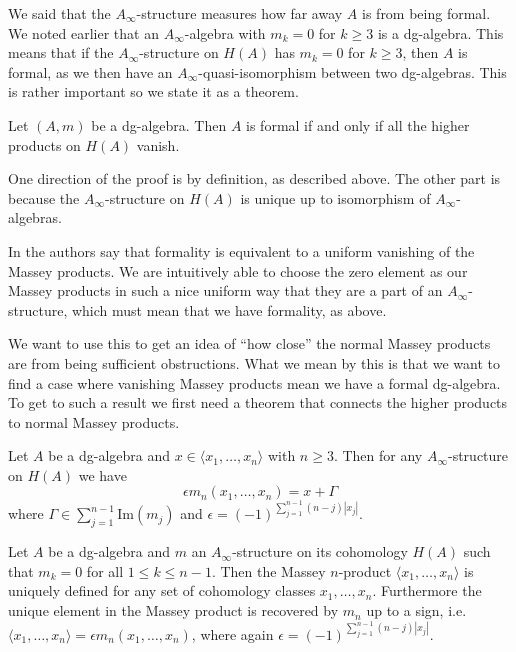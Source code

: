 We said that the $A_\infty$-structure measures how far away $A$ is from being formal. 
We noted earlier that an $A_\infty$-algebra with $m_k=0$ for $k\geq 3$ is a dg-algebra. 
This means that if the $A_\infty$-structure on $H(A)$ has $m_k=0$ for $k\geq 3$, then 
$A$ is formal, as we then have an $A_\infty$-quasi-isomorphism between two dg-algebras. 
This is rather important so we state it as a theorem.

\begin{theorem}
    \label{thm:AHO_formal}
    Let $(A, m)$ be a dg-algebra. Then $A$ is formal if and only if all the higher products
    on $H(A)$ vanish.        
\end{theorem}

One direction of the proof is by definition, as described above. The other part is 
because the $A_\infty$-structure on $H(A)$ is unique up to isomorphism of 
$A_\infty$-algebras.

In \cite{DGMS} the authors say that formality is equivalent to a uniform vanishing of the 
Massey products. We are intuitively able to choose the zero element as our Massey 
products in such a nice uniform way that they are a part of an $A_\infty$-structure, 
which must mean that we have formality, as above.

We want to use this to get an idea of ``how close'' the normal Massey products are 
from being sufficient obstructions. What we mean by this is that we want to find a case 
where vanishing Massey products mean we have a formal dg-algebra. To get to such a result 
we first need a theorem that connects the higher products to normal Massey products.

\begin{theorem}
    Let $A$ be a dg-algebra and $x\in \langle x_1, \ldots, x_n\rangle$ with $n\geq 3$. 
    Then for any $A_\infty$-structure on $H(A)$ we have 
    $$\epsilon m_n(x_1, \ldots, x_n) = x+\Gamma$$ where 
    $\Gamma \in \sum_{j=1}^{n-1}\text{Im}(m_j)$ and 
    $\epsilon = (-1)^{\sum_{j=1}^{n-1} (n-j)|x_j|}$.        
\end{theorem}

\begin{corollary}
    \label{cor:detection_unique}
    Let $A$ be a dg-algebra and $m$ an $A_\infty$-structure on its cohomology $H(A)$ such 
    that $m_k = 0$ for all $1 \leq k \leq n-1$. Then the Massey $n$-product 
    $\langle x_1, \ldots, x_n \rangle$  is uniquely defined for any set of cohomology 
    classes $x_1, \ldots, x_n$. Furthermore the unique element in the Massey product is 
    recovered by $m_n$ up to a sign, i.e. 
    $\langle x_1, \ldots, x_n \rangle = \epsilon m_n(x_1, \ldots, x_n)$, where again 
    $\epsilon = (-1)^{\sum_{j=1}^{n-1} (n-j)|x_j|}$.
\end{corollary}

